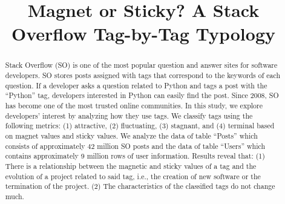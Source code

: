\documentclass[conference]{IEEEtran}
\begin{document}
\title{Magnet or Sticky? A Stack Overflow Tag-by-Tag Typology\\
}

\maketitle

\begin{abstract}
Stack Overflow (SO) is one of the most popular question and answer sites for software developers. SO stores posts assigned with tags that correspond to the keywords of each question. If a developer asks a question related to Python and tags a post with the ``Python'' tag, developers interested in Python can easily find the post. Since 2008, SO has become one of the most trusted online communities. In this study, we explore developers' interest by analyzing how they use tags. We classify tags using the following metrics: (1) attractive, (2) fluctuating, (3) stagnant, and (4) terminal based on magnet values and sticky values. We analyze the data of table ``Posts'' which consists of approximately 42 million SO posts and the data of table ``Users'' which contains approximately 9 million rows of user information. Results reveal that: (1) There is a relationship between the magnetic and sticky values of a tag and the evolution of a project related to said tag, i.e., the creation of new software or the termination of the project. (2) The characteristics of the classified tags do not change much.
\end{abstract}
\end{document}
